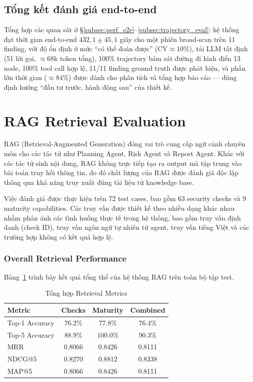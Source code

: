 \subsection{Tổng kết đánh giá end-to-end}
\label{subsec:perf_summary}

Tổng hợp các quan sát ở \S\ref{subsec:perf_e2e}--\ref{subsec:trajectory_eval}: hệ thống đạt thời gian end-to-end $432{,}1 \pm 45{,}1$ giây cho một phiên broad-scan trên 11 finding, với độ ổn định ở mức ``có thể đoán được'' ($\text{CV} \approx 10\%$), tải LLM tất định (51 lời gọi, $\approx 68$k token tổng), 100\% trajectory bám sát đường đi kinh điển 13 node, 100\% tool call hợp lệ, 11/11 finding ground truth được phát hiện, và phần lớn thời gian ($\approx 84\%$) được dành cho phân tích và tổng hợp báo cáo --- đúng định hướng ``đầu tư trước, hành động sau'' của thiết kế.

\section{RAG Retrieval Evaluation}
\label{sec:rag_retrieval_eval}

RAG (Retrieval-Augmented Generation) đóng vai trò cung cấp ngữ cảnh chuyên môn cho các tác tử như Planning Agent, Risk Agent và Report Agent. Khác với các tác tử sinh nội dung, RAG không trực tiếp tạo ra output mà tập trung vào bài toán truy hồi thông tin, do đó chất lượng của RAG được đánh giá độc lập thông qua khả năng truy xuất đúng tài liệu từ knowledge base.

Việc đánh giá được thực hiện trên 72 test cases, bao gồm 63 security checks và 9 maturity capabilities. Các truy vấn được thiết kế theo nhiều dạng khác nhau nhằm phản ánh các tình huống thực tế trong hệ thống, bao gồm truy vấn định danh (check ID), truy vấn ngôn ngữ tự nhiên từ agent, truy vấn tiếng Việt và các trường hợp không có kết quả hợp lệ.

\subsubsection*{Overall Retrieval Performance}

Bảng~\ref{tab:retrieval_overall} trình bày kết quả tổng thể của hệ thống RAG trên toàn bộ tập test.

\begin{table}[!htb]
\centering
\caption{Tổng hợp Retrieval Metrics}
\label{tab:retrieval_overall}
\begin{tabular}{lccc}
\toprule
Metric & Checks & Maturity & Combined \\
\midrule
Top-1 Accuracy & 76.2\% & 77.8\% & 76.4\% \\
Top-5 Accuracy & 88.9\% & 100.0\% & 90.3\% \\
MRR & 0.8066 & 0.8426 & 0.8111 \\
NDCG@5 & 0.8270 & 0.8812 & 0.8338 \\
MAP@5 & 0.8066 & 0.8426 & 0.8111 \\
\bottomrule
\end{tabular}
\end{table}

